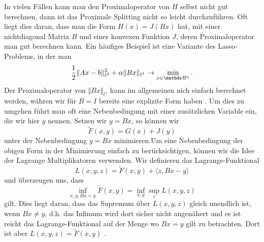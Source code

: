 In vielen F\"allen kann man den Proximaloperator von $H$ selbst nicht gut berechnen, dann ist das Proximale Splitting nicht so leicht durchzuf\"uhren. Oft liegt dies daran, dass man die Form $H(x) = J(Bx)$ hat, mit einer nichtdiagonal Matrix $B$ und einer konvexen Funktion $J$, deren Proximaloperator man gut berechnen kann. Ein h\"aufiges Beispiel ist eine Variante des Lasso-Problems, in der man 
$$ \frac{1}2 \Vert A x - b\Vert_{\ell^2}^2 + \alpha \Vert B x \Vert_{\ell^1} \rightarrow \min_{x \in \R^n}. $$
Der Proximaloperator von $\Vert B x \Vert_{\ell^1}$ kann im allgemeinen nich einfach berechnet werden, w\"ahren wir f\"ur $B=I$ bereits eine explizite Form haben . Um dies zu umgehen f\"uhrt man oft eine Nebenbedingung mit einer zus\"atzlichen Variable ein, die wir hier $y$ nennen. Setzen wir $y=Bx$, so k\"onnen wir 
$$ \tilde F(x,y) = G(x) + J(y) $$
unter der Nebenbedingung $y=Bx$ minimieren.Um eine Nebenbedingung der obigen Form in der Minimierung einfach zu ber\"ucksichtigen, k\"onnen wir die Idee der Lagrange Multiplikatoren verwenden. Wir definieren das Lagrange-Funktional 
$$ L(x,y,z) = \tilde F(x,y) + \langle z, Bx-y \rangle $$ 
und \"uberzeugen uns, dass 
$$ \inf_{x,y,Bx=y} \tilde F(x,y) = \inf_{x,y} \sup_z L(x,y,z) $$
gilt. Dies liegt daran, dass das Supremum \"uber $L(x,y,z)$ gleich unendlich ist, wenn $Bx \neq y$, d.h. das Infimum wird dort sicher nicht angen\"ahert und es ist reicht das Lagrange-Funktional auf der Menge wo $Bx=y$ gilt zu betrachten. Dort ist aber $L(x,y,z) = \tilde F(x,y)$ .

